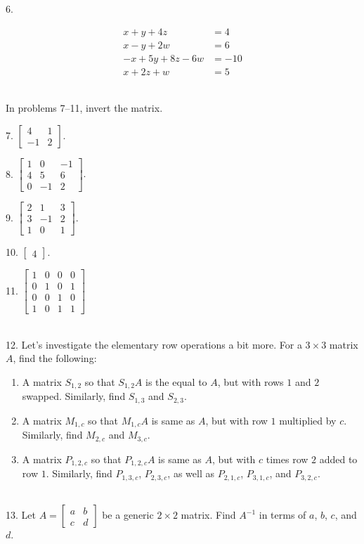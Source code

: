 \documentclass{article}
\begin{document}
6.

\begin{align*}
	x + y + 4z &= 4\\
	x - y + 2w &= 6\\
	-x + 5y + 8z - 6w &= -10\\
	x + 2z + w &= 5
\end{align*}

~\\

In problems 7--11, invert the matrix.

7. $\displaystyle \left[\begin{array}{cc}4& 1 \\ -1& 2\end{array}\right].$

8. $\displaystyle \left[\begin{array}{ccc}1& 0& -1 \\ 4& 5& 6 \\ 0& -1& 2\end{array}\right].$

9. $\displaystyle \left[\begin{array}{ccc}2& 1& 3 \\ 3& -1& 2 \\ 1& 0& 1\end{array}\right].$

10. $\displaystyle \left[\begin{array}{c}4\end{array}\right].$

11. $\displaystyle \left[\begin{array}{cccc}1& 0& 0& 0 \\ 0& 1& 0& 1 \\ 0& 0& 1& 0 \\ 1& 0& 1& 1\end{array}\right]$

~\\

12. Let's investigate the elementary row operations a bit more. For a $3 \times 3$ matrix $A$, find the following:

\begin{enumerate}

	\item A matrix $S_{1, 2}$ so that $S_{1, 2}A$ is the equal to $A$, but with rows $1$ and $2$ swapped. Similarly, find $S_{1, 3}$ and $S_{2, 3}$.

	\item A matrix $M_{1, c}$ so that $M_{1, c}A$ is same as $A$, but with row $1$ multiplied by $c$. Similarly, find $M_{2, c}$ and $M_{3, c}$.

	\item A matrix $P_{1, 2, c}$ so that $P_{1, 2, c}A$ is same as $A$, but with $c$ times row $2$ added to row $1$. Similarly, find $P_{1, 3, c}$, $P_{2, 3, c}$, as well as $P_{2, 1, c}$, $P_{3, 1, c}$, and $P_{3, 2, c}$.

\end{enumerate}

~\\

13. Let $\displaystyle A = \left[\begin{array}{cc}a& b \\ c& d\end{array}\right]$ be a generic $2 \times 2$ matrix. Find $A^{-1}$ in terms of $a$, $b$, $c$, and $d$.
\end{document}
